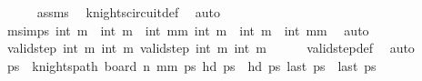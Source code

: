 \begin{isabellebody}
\ \ \ \ \isamarkupfalse%
\ assms\ \isamarkupfalse%
\ knights{\isacharunderscore}{\kern0pt}circuit{\isacharunderscore}{\kern0pt}def\ \isamarkupfalse%
\ auto\isanewline
\isanewline
\ \ \isamarkupfalse%
\ m{\isacharunderscore}{\kern0pt}simps{\isacharcolon}{\kern0pt}\ {\isachardoublequoteopen}int\ m\ {\isacharplus}{\kern0pt}\ {\isacharparenleft}{\kern0pt}int\ m\ {\isacharequal}{\kern0pt}\ int\ {\isacharparenleft}{\kern0pt}mm\ {\isachardoublequoteopen}int\ m\ {\isacharplus}{\kern0pt}\ int\ m\ {\isacharequal}{\kern0pt}\ int\ {\isacharparenleft}{\kern0pt}mm\ \isamarkupfalse%
\ auto\isanewline
\isanewline
\ \ \isamarkupfalse%
\ {\isachardoublequoteopen}valid{\isacharunderscore}{\kern0pt}step\ {\isacharparenleft}{\kern0pt}{}{\isacharcomma}{\kern0pt}int\ m\ {\isacharparenleft}{\kern0pt}{}{\isacharcomma}{\kern0pt}int\ m\ {\isachardoublequoteopen}valid{\isacharunderscore}{\kern0pt}step\ {\isacharparenleft}{\kern0pt}{}{\isacharcomma}{\kern0pt}int\ m\ {\isacharparenleft}{\kern0pt}{}{\isacharcomma}{\kern0pt}int\ m\isanewline
\ \ \ \ \isamarkupfalse%
\ valid{\isacharunderscore}{\kern0pt}step{\isacharunderscore}{\kern0pt}def\ \isamarkupfalse%
\ auto\isanewline
\ \ \isamarkupfalse%
\ \isamarkupfalse%
\ ps\ \ {\isachardoublequoteopen}knights{\isacharunderscore}{\kern0pt}path\ {\isacharparenleft}{\kern0pt}board\ n\ {\isacharparenleft}{\kern0pt}mm\ ps{\isachardoublequoteclose}\ {\isachardoublequoteopen}hd\ ps\ {\isacharequal}{\kern0pt}\ hd\ ps\ {\isachardoublequoteopen}last\ ps\ {\isacharequal}{\kern0pt}\ last\ ps\ \ \isanewline

\end{isabellebody}
